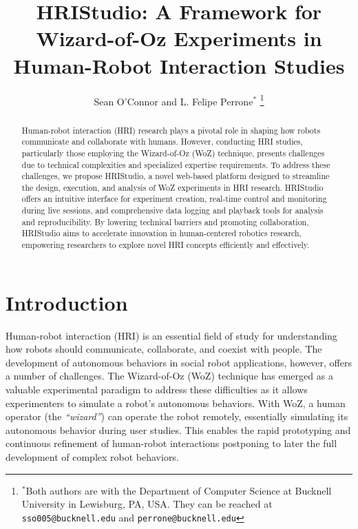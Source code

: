 \documentclass[letterpaper, 10 pt, conference]{ieeeconf}
\title{\LARGE \bf HRIStudio: A Framework for Wizard-of-Oz Experiments in Human-Robot Interaction Studies}
\author{Sean O'Connor and L. Felipe Perrone$^{*}$%
    \thanks{$^{*}$Both authors are with the Department of Computer Science at
        Bucknell University in Lewisburg, PA, USA. They can be reached at {\tt\small sso005@bucknell.edu} and {\tt\small perrone@bucknell.edu}}%
}
\begin{document}
\maketitle
\thispagestyle{empty}
\pagestyle{empty}


\begin{abstract}

Human-robot interaction (HRI) research plays a pivotal role in shaping how robots communicate and collaborate with humans. However, conducting HRI studies, particularly those employing the Wizard-of-Oz (WoZ) technique, presents challenges due to technical complexities and specialized expertise requirements. To address these challenges, we propose HRIStudio, a novel web-based platform designed to streamline the design, execution, and analysis of WoZ experiments in HRI research. HRIStudio offers an intuitive interface for experiment creation, real-time control and monitoring during live sessions, and comprehensive data logging and playback tools for analysis and reproducibility. By lowering technical barriers and promoting collaboration, HRIStudio aims to accelerate innovation in human-centered robotics research, empowering researchers to explore novel HRI concepts efficiently and effectively.

\end{abstract}




\section{Introduction}

Human-robot interaction (HRI) is an essential field of study for understanding how robots should communicate, collaborate, and coexist with people. The development of autonomous behaviors in social robot applications, however, offers a number of challenges. The Wizard-of-Oz (WoZ) technique has emerged as a valuable experimental paradigm to address these difficulties as it allows experimenters to simulate a robot's autonomous behaviors. With WoZ, a human operator (the \emph{``wizard''}) can operate the robot remotely, essentially simulating its autonomous behavior during user studies. This enables the rapid prototyping and continuous refinement of human-robot interactions postponing to later the full development of complex robot behaviors.
\end{document}
